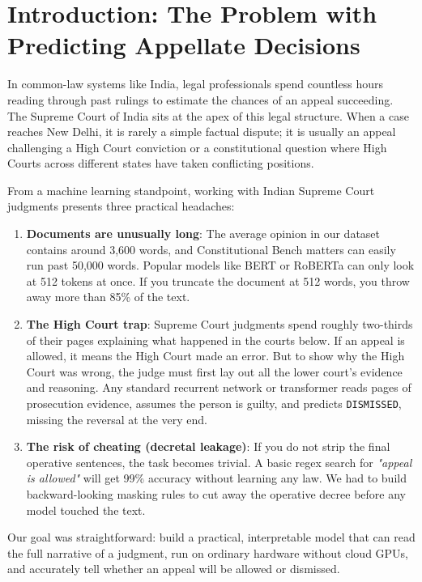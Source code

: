 \documentclass[11pt,a4paper]{article}
\begin{document}
\newpage

\section{Introduction: The Problem with Predicting Appellate Decisions}
In common-law systems like India, legal professionals spend countless hours reading through past rulings to estimate the chances of an appeal succeeding. The Supreme Court of India sits at the apex of this legal structure. When a case reaches New Delhi, it is rarely a simple factual dispute; it is usually an appeal challenging a High Court conviction or a constitutional question where High Courts across different states have taken conflicting positions.

From a machine learning standpoint, working with Indian Supreme Court judgments presents three practical headaches:
\begin{enumerate}
    \item \textbf{Documents are unusually long}: The average opinion in our dataset contains around 3,600 words, and Constitutional Bench matters can easily run past 50,000 words. Popular models like BERT or RoBERTa can only look at 512 tokens at once. If you truncate the document at 512 words, you throw away more than 85\% of the text.
    \item \textbf{The High Court trap}: Supreme Court judgments spend roughly two-thirds of their pages explaining what happened in the courts below. If an appeal is allowed, it means the High Court made an error. But to show why the High Court was wrong, the judge must first lay out all the lower court's evidence and reasoning. Any standard recurrent network or transformer reads pages of prosecution evidence, assumes the person is guilty, and predicts \texttt{DISMISSED}, missing the reversal at the very end.
    \item \textbf{The risk of cheating (decretal leakage)}: If you do not strip the final operative sentences, the task becomes trivial. A basic regex search for \textit{"appeal is allowed"} will get 99\% accuracy without learning any law. We had to build backward-looking masking rules to cut away the operative decree before any model touched the text.
\end{enumerate}

Our goal was straightforward: build a practical, interpretable model that can read the full narrative of a judgment, run on ordinary hardware without cloud GPUs, and accurately tell whether an appeal will be allowed or dismissed.
\end{document}
